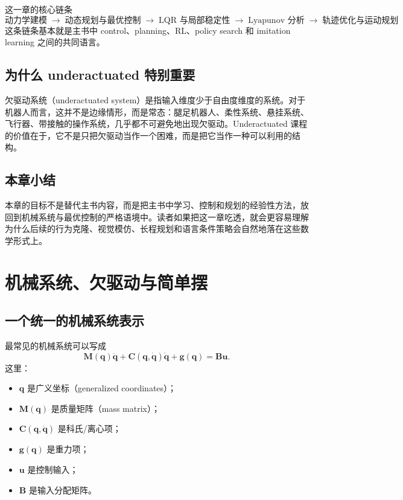 \documentclass[a4paper]{article}
\newcommand{\bu}{\mathbf{u}}
\newcommand{\bq}{\mathbf{q}}
\newcommand{\bM}{\mathbf{M}}
\newcommand{\bC}{\mathbf{C}}
\newcommand{\bB}{\mathbf{B}}
\newcommand{\bg}{\mathbf{g}}
\begin{document}
\begin{importantbox}{这一章的核心链条}
\[
\text{动力学建模} \;\to\; \text{动态规划与最优控制} \;\to\; \text{LQR 与局部稳定性}
\;\to\; \text{Lyapunov 分析} \;\to\; \text{轨迹优化与运动规划}
\]
这条链条基本就是主书中 control、planning、RL、policy search 和 imitation learning 之间的共同语言。
\end{importantbox}

\subsection{为什么 underactuated 特别重要}

欠驱动系统（underactuated system）是指输入维度少于自由度维度的系统。对于机器人而言，这并不是边缘情形，而是常态：腿足机器人、柔性系统、悬挂系统、飞行器、带接触的操作系统，几乎都不可避免地出现欠驱动。Underactuated 课程的价值在于，它不是只把欠驱动当作一个困难，而是把它当作一种可以利用的结构。

\subsection{本章小结}

本章的目标不是替代主书内容，而是把主书中学习、控制和规划的经验性方法，放回到机械系统与最优控制的严格语境中。读者如果把这一章吃透，就会更容易理解为什么后续的行为克隆、视觉模仿、长程规划和语言条件策略会自然地落在这些数学形式上。

\section{机械系统、欠驱动与简单摆}

\subsection{一个统一的机械系统表示}

最常见的机械系统可以写成
\[
\bM(\bq)\ddot{\bq} + \bC(\bq,\dot{\bq})\dot{\bq} + \bg(\bq) = \bB\bu.
\]
这里：
\begin{itemize}
  \item $\bq$ 是广义坐标（generalized coordinates）；
  \item $\bM(\bq)$ 是质量矩阵（mass matrix）；
  \item $\bC(\bq,\dot{\bq})$ 是科氏/离心项；
  \item $\bg(\bq)$ 是重力项；
  \item $\bu$ 是控制输入；
  \item $\bB$ 是输入分配矩阵。
\end{itemize}
\end{document}
